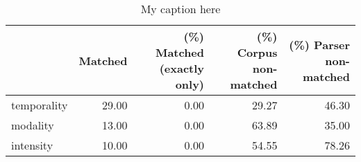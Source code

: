 \begin{table}[!ht]
\centering
\begin{tabular}{lrrrr}
\toprule
{} &  Matched &  (\%) Matched (exactly only) &  (\%) Corpus non-matched &  (\%) Parser non-matched \\
\midrule
temporality &    29.00 &                        0.00 &                   29.27 &                   46.30 \\
modality    &    13.00 &                        0.00 &                   63.89 &                   35.00 \\
intensity   &    10.00 &                        0.00 &                   54.55 &                   78.26 \\
\bottomrule
\end{tabular}
\caption{My caption here}
\label{tab:MOOD_ASSESMENT-ocd-relative}
\end{table}